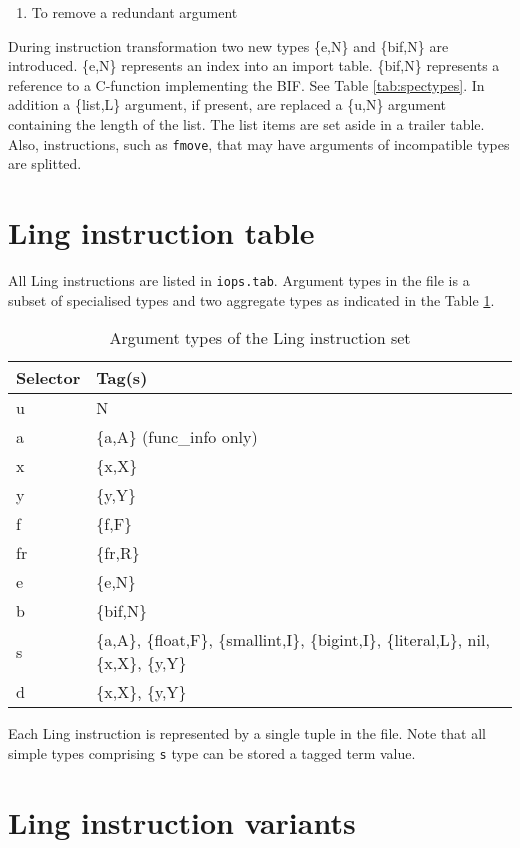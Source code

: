 \documentclass{article}
\begin{document}
\begin{enumerate}
\item To remove a redundant argument
\end{enumerate}

During instruction transformation two new types \{e,N\} and \{bif,N\} are
introduced. \{e,N\} represents an index into an import table. \{bif,N\}
represents a reference to a C-function implementing the BIF. See Table
\ref{tab:spectypes}. In addition a \{list,L\} argument, if present, are replaced
a \{u,N\} argument containing the length of the list. The list items are set
aside in a trailer table. Also, instructions, such as \texttt{fmove}, that may
have arguments of incompatible types are splitted. 

\section*{Ling instruction table}

All Ling instructions are listed in \texttt{iops.tab}. Argument types in the
file is a subset of specialised types and two aggregate types as indicated in
the Table \ref{tab:iopstab}.

\begin{table}[!ht]
\begin{tabular}{ll}
Selector & Tag(s)\\
\hline
u & N \\
a & \{a,A\} (func\_info only) \\
x & \{x,X\} \\
y & \{y,Y\} \\
f & \{f,F\} \\
fr & \{fr,R\} \\
e & \{e,N\} \\
b & \{bif,N\} \\
s & \{a,A\}, \{float,F\}, \{smallint,I\}, \{bigint,I\}, \{literal,L\}, nil,
\{x,X\}, \{y,Y\} \\
d & \{x,X\}, \{y,Y\} \\
\hline
\end{tabular}
\caption{Argument types of the Ling instruction set\label{tab:iopstab}}
\end{table}

Each Ling instruction is represented by a single tuple in the file. Note that all
simple types comprising \texttt{s} type can be stored a tagged term value.

\section*{Ling instruction variants}
\end{document}
